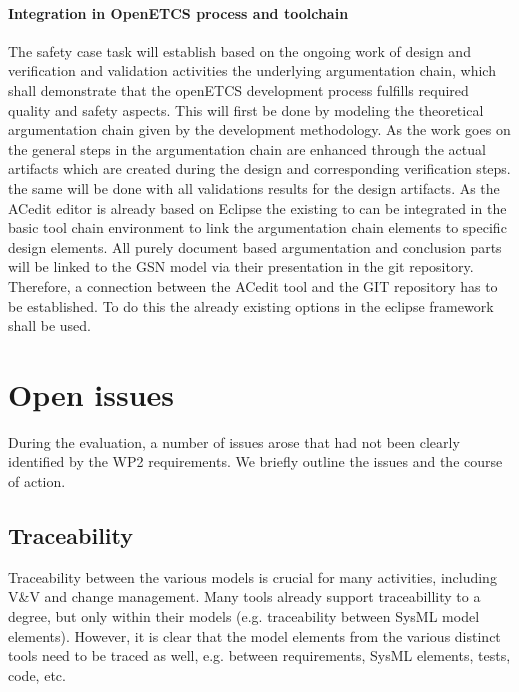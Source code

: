 \paragraph{Integration in OpenETCS process and toolchain}

The safety case task will establish based on the ongoing work of design and verification and validation activities the underlying argumentation chain, which shall demonstrate that the openETCS development process fulfills required quality and safety aspects. This will first be done by modeling the theoretical argumentation chain given by the development methodology. 
As the work goes on the general steps in the argumentation chain are enhanced through the actual artifacts which are created during the design and corresponding verification steps. the same will be done with all validations results for the design artifacts. 
As the ACedit editor is already based on Eclipse the existing to can be integrated in the basic tool chain environment to link the argumentation chain elements to specific design elements. All purely document based argumentation and conclusion parts will be linked to the GSN model via their presentation in the git repository. Therefore, a connection between the ACedit tool and the GIT repository has to be established. To do this the already existing options in the eclipse framework shall be used.

%

\section{Open issues}

During the evaluation, a number of issues arose that had not been clearly identified by the WP2 requirements.  We briefly outline the issues and the course of action.

\subsection{Traceability}

Traceability between the various models is crucial for many activities, including V\&V and change management.  Many tools already support traceabillity to a degree, but only within their models (e.g. traceability between SysML model elements).  However, it is clear that the model elements from the various distinct tools need to be traced as well, e.g. between requirements, SysML elements, tests, code, etc.

